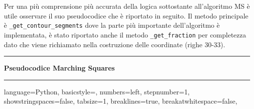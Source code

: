 \documentclass[12pt,a4paper]{report}
\begin{document}
Per una più comprensione più accurata della logica sottostante all'algoritmo MS è utile osservare il suo pseudocodice che è riportato in seguito. \newline
Il metodo principale è \verb|_get_contour_segments| dove la parte più importante dell'algoritmo è implementata, è stato riportato anche il metodo \verb|_get_fraction| per completezza dato che viene richiamato nella costruzione delle coordinate (righe 30-33). 
\\[10pt]
\noindent\rule[0.5ex]{\linewidth}{2pt}
\small{\textbf{Pseudocodice Marching Squares}} \\
\noindent\rule[0.5ex]{\linewidth}{1pt}
\lstset
{ %
    language=Python,
    basicstyle=\footnotesize,
    numbers=left,
    stepnumber=1,
    showstringspaces=false,
    tabsize=1,
    breaklines=true,
    breakatwhitespace=false,
}
\end{document}
